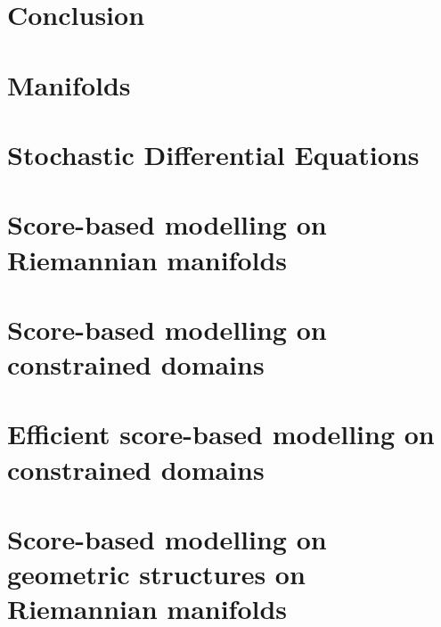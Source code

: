 \documentclass[11pt]{book}
\begin{document}
\chapter{Conclusion}


\printbibliography

\appendix

\chapter{Manifolds} \label{chp:manifolds}  

\chapter{Stochastic Differential Equations} \label{chp:sdes}  

\chapter{Score-based modelling on Riemannian manifolds}


\chapter{Score-based modelling on constrained domains}


\chapter{Efficient score-based modelling on constrained domains}


\chapter{Score-based modelling on geometric structures on Riemannian manifolds}

\end{document}
